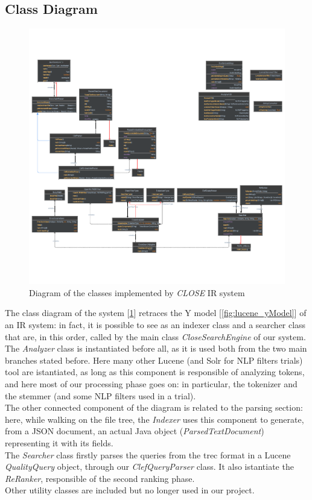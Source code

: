 \newpage
\enlargethispage{5\baselineskip}
\subsection{Class Diagram}

\begin{figure}[!h]
    \centering
    \includegraphics[height=0.7\textheight, angle =90, keepaspectratio]{figure/Classes_diagram_white_crop.pdf}
    \caption{Diagram of the classes implemented by \textit{CLOSE} \ac{IR} system}
    \label{fig:Classes_diagram_white}
\end{figure}
\clearpage
The class diagram of the system [\ref{fig:Classes_diagram_white}] retraces the Y model [\ref{fig:lucene_yModel}] of an IR system: in fact, it is possible to see as an indexer class and a searcher class that are, in this order,
called by the main class \textit{CloseSearchEngine} of our system. The \textit{Analyzer} class is instantiated before all, as it is used both from the two main branches stated before. Here many other Lucene (and Solr for NLP filters trials) tool are istantiated, as long as this component
is responsible of analyzing tokens, and here most of our processing phase goes on: in particular, the tokenizer and the stemmer (and some NLP filters used in a trial).\\
The other connected component of the diagram is related to the parsing section: here, while walking on the file tree, the \textit{Indexer} uses this component to generate, from a JSON document, an actual Java object (\textit{ParsedTextDocument}) representing it with its fields.\\
The \textit{Searcher} class firstly parses the queries from the trec format in a Lucene \textit{QualityQuery} object, through our \textit{ClefQueryParser} class. It also istantiate the \textit{ReRanker}, responsible of the second ranking phase.\\
Other utility classes are included but no longer used in our project.


